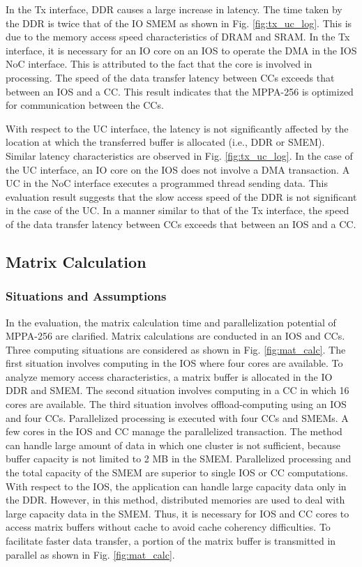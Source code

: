   In the Tx interface, DDR causes a large increase in latency.
  The time taken by the DDR is twice that of the IO SMEM as shown in Fig. \ref{fig:tx_uc_log}.
  This is due to the memory access speed characteristics of DRAM and SRAM.
  In the Tx interface, it is necessary for an IO core on an IOS to operate the DMA in the IOS NoC interface.
  This is attributed to the fact that the core is involved in processing.
  The speed of the data transfer latency between CCs exceeds that between an IOS and a CC.
  This result indicates that the MPPA-256 is optimized for communication between the CCs.
  
  With respect to the UC interface, the latency is not significantly affected by the location at which the transferred buffer is allocated (i.e., DDR or SMEM).
  Similar latency characteristics are observed in Fig. \ref{fig:tx_uc_log}.
  In the case of the UC interface, an IO core on the IOS does not involve a DMA transaction.
  A UC in the NoC interface executes a programmed thread sending data.
  This evaluation result suggests that the slow access speed of the DDR is not significant in the case of the UC.
  In a manner similar to that of the Tx interface, the speed of the data transfer latency between CCs exceeds that between an IOS and a CC.
  
  \subsection{Matrix Calculation}
  \label{sec:martix_eval}
  
  \subsubsection{Situations and Assumptions}
  \label{sec:situations_and_assumptions}
  In the evaluation, the matrix calculation time and parallelization potential of MPPA-256 are clarified.
  Matrix calculations are conducted in an IOS and CCs.
  Three computing situations are considered as shown in Fig. \ref{fig:mat_calc}.
  The first situation involves computing in the IOS where four cores are available.
  To analyze memory access characteristics, a matrix buffer is allocated in the IO DDR and SMEM.
  The second situation involves computing in a CC in which 16 cores are available.
  The third situation involves offload-computing using an IOS and four CCs.
  Parallelized processing is executed with four CCs and SMEMs.
  A few cores in the IOS and CC manage the parallelized transaction.
  The method can handle large amount of data in which one cluster is not sufficient, because buffer capacity is not limited to 2 MB in the SMEM.
  Parallelized processing and the total capacity of the SMEM are superior to single IOS or CC computations. 
  With respect to the IOS, the application can handle large capacity data only in the DDR.
  However, in this method, distributed memories are used to deal with large capacity data in the SMEM.
  Thus, it is necessary for IOS and CC cores to access matrix buffers without cache to avoid cache coherency difficulties.
  To facilitate faster data transfer, a portion of the matrix buffer is transmitted in parallel as shown in Fig. \ref{fig:mat_calc}.
  
